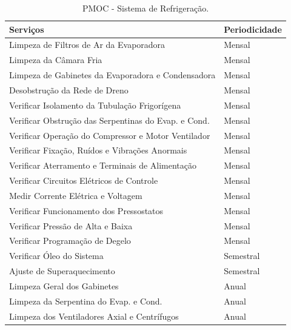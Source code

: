 \documentclass[10pt,a4paper]{article}
\begin{document}
\begin{table}[h!]
    \centering
    \vspace{0.8mm}
    \caption{PMOC - Sistema de Refrigeração.}
    \begin{tabular}{|l|l|}
        \hline      
       \textbf{Serviços} & \textbf{Periodicidade} \\ \hline
        Limpeza de Filtros de Ar da Evaporadora & Mensal \\ \hline
        Limpeza da Câmara Fria & Mensal \\ \hline
        Limpeza de Gabinetes da Evaporadora e Condensadora & Mensal \\ \hline
        Desobstrução da Rede de Dreno & Mensal \\ \hline
        Verificar Isolamento da Tubulação Frigorígena & Mensal \\ \hline
        Verificar Obstrução das Serpentinas do Evap. e Cond. & Mensal \\ \hline
        Verificar Operação do Compressor e Motor Ventilador & Mensal \\ \hline
        Verificar Fixação, Ruídos e Vibrações Anormais & Mensal \\ \hline
        Verificar Aterramento e Terminais de Alimentação & Mensal \\ \hline
        Verificar Circuitos Elétricos de Controle & Mensal \\ \hline
        Medir Corrente Elétrica e Voltagem & Mensal \\ \hline
        Verificar Funcionamento dos Pressostatos & Mensal \\ \hline
        Verificar Pressão de Alta e Baixa & Mensal \\ \hline
        Verificar Programação de Degelo & Mensal \\ \hline
        Verificar Óleo do Sistema & Semestral \\ \hline
        Ajuste de Superaquecimento & Semestral \\ \hline
        Limpeza Geral dos Gabinetes & Anual \\ \hline
        Limpeza da Serpentina do Evap. e Cond. & Anual \\ \hline
        Limpeza dos Ventiladores Axial e Centrífugos & Anual \\ \hline
    \end{tabular}
    \label{tubrefri}
\end{table}

\clearpage
\end{document}

